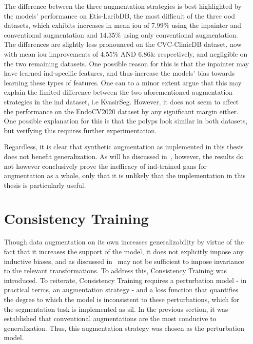 The difference between the three augmentation strategies is best highlighted by the models' performance on Etis-LaribDB, the most difficult of the three \gls{ood} datasets, which exhibits increases in mean \gls{iou} of 7.99\% using the inpainter and conventional augmentation and 14.35\% using only conventional augmentation. The differences are slightly less pronounced on the CVC-ClinicDB dataset, now with mean \gls{iou} improvements of 4.55\% AND 6.86\& respectively, and negligible on the two remaining datasets. One possible reason for this is that the inpainter may have learned \gls{ind}-specific features, and thus increase the models' bias towards learning these types of features. One can to a minor extent argue that this may explain the limited difference between the two aforementioned augmentation strategies in the \gls{ind} dataset, i.e KvasirSeg. However, it does not seem to affect the performance on the EndoCV2020 dataset by any significant margin either. One possible explanation for this is that the polyps look similar in both datasets, but verifying this requires further experimentation. 

Regardless, it is clear that synthetic augmentation as implemented in this thesis does not benefit generalization. As will be discussed in~, however, the results do not however conclusively prove the inefficacy of \gls{ind}-trained \glspl{gan} for augmentation as a whole, only that it is unlikely that the implementation in this thesis is particularly useful. 


\section{Consistency Training}\label{consistency_training}
Though data augmentation on its own increases generalizability by virtue of the fact that it increases the support of the model, it does not explicitly impose any inductive biases, and as discussed in~ may not be sufficient to impose invariance to the relevant transformations. To address this, Consistency Training was introduced. To reiterate, Consistency Training requires a perturbation model - in practical terms, an augmentation strategy - and a loss function that quantifies the degree to which the model is inconsistent to these perturbations, which for the segmentation task is implemented as \gls{sil}. In the previous section, it was established that conventional augmentations are the most conducive to generalization. Thus, this augmentation strategy was chosen as the perturbation model. 

